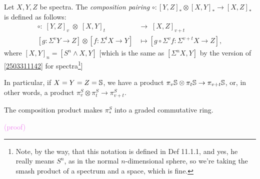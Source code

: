 \documentclass{MetricNotes2023}
\def\bb{\ensuremath\mathbb}
\def\inte{\ensuremath\mathbb{Z}}
\def\textcolour{\textcolor}
\begin{document}
\begin{definition}
Let \(X, Y, Z\) be spectra. The \textit{composition pairing} \(\circ : [Y, Z]_* \otimes [X,Y]_* \to [X,Z]_*\) is defined as follows: 
\begin{align*}
\circ :\; [Y, Z]_v\; \otimes \;[X,Y]_t\; &\to\; [X,Z]_{v+t}\\
[g : \Sigma^v Y \to Z]\otimes [f : \Sigma^t X\to Y] &\mapsto [g \circ \Sigma^v f : \Sigma^{v+t}X\to Z],
\end{align*}
where \([X,Y]_n=[S^n\wedge X, Y]\) [which is the same as \([\Sigma^n X, Y]\) by the version of \ref{2503311142} for spectra\footnote{Note, by the way, that this notation is defined in \autocite{rognes2} Def 11.1.1, and yes, he really means \(S^n\), as in the normal \(n\)-dimensional sphere, so we're taking the smash product of a spectrum and a space, which is fine.}]
\end{definition}

In particular, if \(X=Y=Z=\bb{S}\), we have a product \(\pi_v \bb{S}\otimes \pi_t \bb{S}\to \pi_{v+t}\bb{S}\), or, in other words, a product \(\pi_v^S\otimes \pi_t^S\to \pi_{v+t}^S\). 

\begin{lemma}
The composition product makes \(\pi_*^S\) into a graded commutative ring. 
\end{lemma}

\textcolour{violet}{(proof)}

\end{document}
